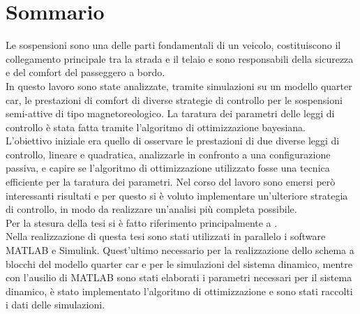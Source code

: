 \chapter*{Sommario} %
\label{sommario}


Le sospensioni sono una delle parti fondamentali di un veicolo, costituiscono il collegamento principale tra la strada e il telaio e sono responsabili della sicurezza e del comfort del passeggero a bordo.\\
In questo lavoro sono state analizzate, tramite simulazioni su un modello quarter car, le prestazioni di comfort di diverse strategie di controllo per le sospensioni semi-attive di tipo magnetoreologico. La taratura dei parametri delle leggi di controllo è stata fatta tramite l'algoritmo di ottimizzazione bayesiana.\\
L'obiettivo iniziale era quello di osservare le prestazioni di due diverse leggi di controllo, lineare e quadratica, analizzarle in confronto a una configurazione passiva, e capire se l'algoritmo di ottimizzazione utilizzato fosse una tecnica efficiente per la taratura dei parametri. Nel corso del lavoro sono emersi però interessanti risultati e per questo si è voluto implementare un'ulteriore strategia di controllo, in modo da realizzare un'analisi più completa possibile.\\

Per la stesura della tesi si è fatto riferimento principalmente a \cite{controlMRdampers}.\\

Nella realizzazione di questa tesi sono stati utilizzati in parallelo i software MATLAB e Simulink. Quest'ultimo necessario per la realizzazione dello schema a blocchi del modello quarter car e per le simulazioni del sistema dinamico, mentre con l'ausilio di MATLAB sono stati elaborati i parametri necessari per il sistema dinamico, è stato implementato l'algoritmo di ottimizzazione e sono stati raccolti i dati delle simulazioni.\\



